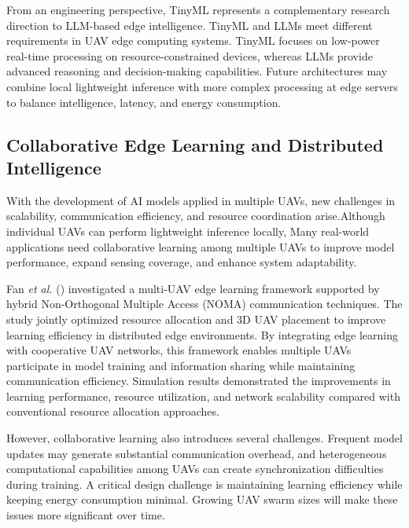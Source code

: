 \documentclass[a4paper, 12pt]{article}
\begin{document}
From an engineering perspective, TinyML represents a complementary research direction to LLM-based edge intelligence. TinyML and LLMs meet different requirements in UAV edge computing systems. TinyML focuses on low-power real-time processing on resource-constrained devices, whereas LLMs provide advanced reasoning and decision-making capabilities. Future architectures may combine local lightweight inference with more complex processing at edge servers to balance intelligence, latency, and energy consumption.

\subsection*{Collaborative Edge Learning and Distributed Intelligence}
With the development of AI models applied in multiple UAVs, new challenges in scalability, communication efficiency, and resource coordination arise.Although individual UAVs can perform lightweight inference locally, Many real-world applications need collaborative learning among multiple UAVs to improve model performance, expand sensing coverage, and enhance system adaptability. 

Fan \textit{et al.} (\cite{Fan2025}) investigated a multi-UAV edge learning framework supported by hybrid Non-Orthogonal Multiple Access (NOMA) communication techniques. The study jointly optimized resource allocation and 3D UAV placement to improve learning efficiency in distributed edge environments. By integrating edge learning with cooperative UAV networks, this framework enables multiple UAVs participate in model training and information sharing while maintaining communication efficiency. Simulation results demonstrated the improvements in learning performance, resource utilization, and network scalability compared with conventional resource allocation approaches.

However, collaborative learning also introduces several challenges. Frequent model updates may generate substantial communication overhead, and heterogeneous computational capabilities among UAVs can create synchronization difficulties during training. A critical design challenge is maintaining learning efficiency while keeping energy consumption minimal. Growing UAV swarm sizes will make these issues more significant over time.
\end{document}
